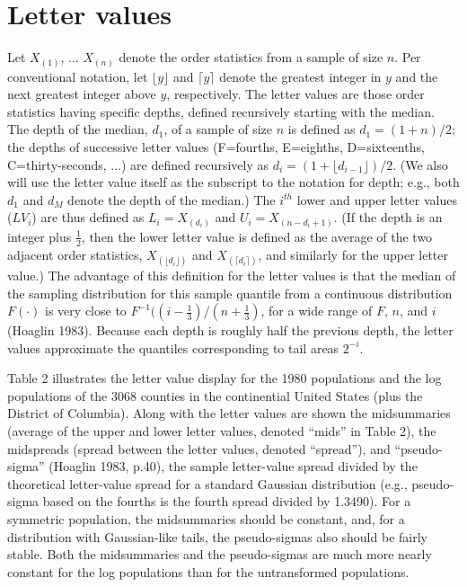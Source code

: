 \documentclass[11pt]{article}
\begin{document}
\section {Letter values}

Let $X_{(1)}$, ...  $X_{(n)}$ denote the order statistics
from a sample of size $n$.
Per conventional notation, let $\lfloor y \rfloor$ and
$\lceil y \rceil$ denote the greatest integer in $y$ and
the next greatest integer above $y$, respectively.
The letter values are those order statistics having specific
depths, defined recursively starting with the median.
The depth of the median, $d_1$, of a sample of size $n$
is defined as $d_1 = (1 +  n )/2$; the depths
of successive letter values (F=fourths, E=eighths, 
D=sixteenths, C=thirty-seconds, ...) are defined recursively 
as $d_i = (1 + \lfloor d_{i-1} \rfloor)/2$.  
(We also will use the letter value itself as the subscript
to the notation for depth; e.g., both $d_1$ and $d_M$ denote
the depth of the median.)
The $i^{th}$ lower and upper letter values  ($LV_i$) 
are thus defined as $L_i = X_{(d_i)}$ and
$U_i = X_{(n-d_i+1)}$.
(If the depth is an integer plus $\frac{1}{2}$, then the lower 
letter value is defined as the average of the two adjacent order
statistics, $X_{(\lfloor d_i \rfloor)}$ and
$X_{(\lceil d_i \rceil)}$, and similarly for the upper
letter value.)
The advantage of this definition for the letter values
is that the median of the sampling distribution for
this sample quantile from a
continuous distribution $F(\cdot)$ is very close to
$F^{-1} ((i - \frac{1}{3})/(n + \frac{1}{3})$, for a 
wide range of $F$, $n$, and $i$ (Hoaglin 1983).
Because each depth is roughly half the previous depth,
the letter values approximate the quantiles corresponding
to tail areas $2^{-i}$.

Table 2 illustrates the letter value display for the 1980 
populations and the log populations of the 3068 counties in 
the continential United States (plus the District of Columbia).
Along with the letter values are shown the midsummaries
(average of the upper and lower letter values, denoted ``mids''
in Table 2), 
the midspreads (spread between the letter values, denoted
``spread''), and ``pseudo-sigma'' (Hoaglin 1983, p.40), 
the sample letter-value spread divided by the theoretical
letter-value spread for a standard Gaussian
distribution (e.g., pseudo-sigma based on the fourths is 
the fourth spread divided by 1.3490).
For a symmetric population, the midsummaries should
be constant, and, for a distribution with Gaussian-like
tails, the pseudo-sigmas also should be fairly stable.
Both the midsummaries and the pseudo-sigmas are much more
nearly constant for the log populations than for the
untransformed populations.
\end{document}
